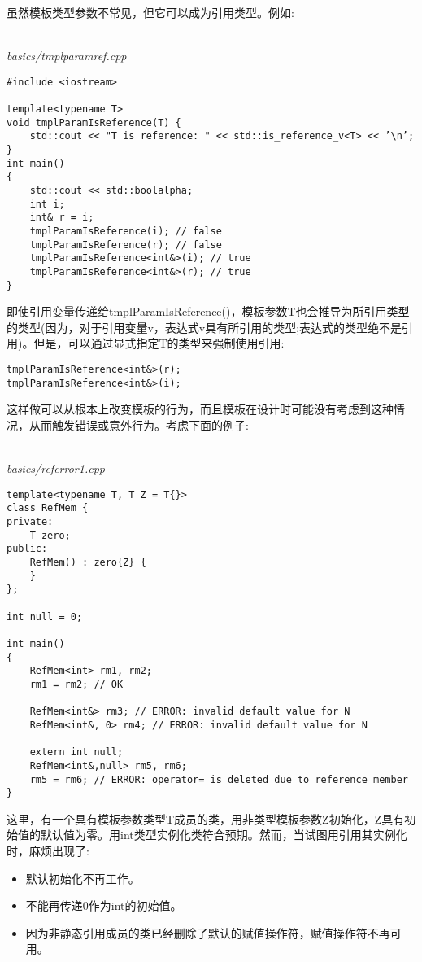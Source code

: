 虽然模板类型参数不常见，但它可以成为引用类型。例如:

\hspace*{\fill} \\ %
\noindent
\textit{basics/tmplparamref.cpp}
\begin{lstlisting}[style=styleCXX]
#include <iostream>

template<typename T>
void tmplParamIsReference(T) {
	std::cout << "T is reference: " << std::is_reference_v<T> << ’\n’;
}
int main()
{
	std::cout << std::boolalpha;
	int i;
	int& r = i;
	tmplParamIsReference(i); // false
	tmplParamIsReference(r); // false
	tmplParamIsReference<int&>(i); // true
	tmplParamIsReference<int&>(r); // true
}
\end{lstlisting}

即使引用变量传递给tmplParamIsReference()，模板参数T也会推导为所引用类型的类型(因为，对于引用变量v，表达式v具有所引用的类型;表达式的类型绝不是引用)。但是，可以通过显式指定T的类型来强制使用引用:

\begin{lstlisting}[style=styleCXX]
tmplParamIsReference<int&>(r);
tmplParamIsReference<int&>(i);
\end{lstlisting}

这样做可以从根本上改变模板的行为，而且模板在设计时可能没有考虑到这种情况，从而触发错误或意外行为。考虑下面的例子:

\hspace*{\fill} \\ %
\noindent
\textit{basics/referror1.cpp}
\begin{lstlisting}[style=styleCXX]
template<typename T, T Z = T{}>
class RefMem {
private:
	T zero;
public:
	RefMem() : zero{Z} {
	}
};

int null = 0;

int main()
{
	RefMem<int> rm1, rm2;
	rm1 = rm2; // OK
	
	RefMem<int&> rm3; // ERROR: invalid default value for N
	RefMem<int&, 0> rm4; // ERROR: invalid default value for N
	
	extern int null;
	RefMem<int&,null> rm5, rm6;
	rm5 = rm6; // ERROR: operator= is deleted due to reference member
}
\end{lstlisting}

这里，有一个具有模板参数类型T成员的类，用非类型模板参数Z初始化，Z具有初始值的默认值为零。用int类型实例化类符合预期。然而，当试图用引用其实例化时，麻烦出现了:

\begin{itemize}
\item 
默认初始化不再工作。

\item 
不能再传递0作为int的初始值。

\item 
因为非静态引用成员的类已经删除了默认的赋值操作符，赋值操作符不再可用。
\end{itemize}

